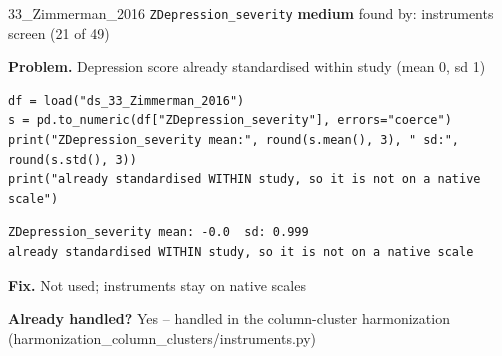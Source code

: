 \documentclass[9pt, t, handout]{beamer}
\newcommand{\ans}[1]{\textcolor{structure.fg}{#1}}
\begin{document}
\begin{frame}[fragile]{33\_Zimmerman\_2016 \quad \texttt{ZDepression\_severity}}
  {\scriptsize\textcolor{blue!55!black}{\textbf{medium}} \quad
   found by: instruments screen \quad (21 of 49)}
  \vspace{3pt}

  {\footnotesize \textbf{Problem.} Depression score already standardised within study (mean 0, sd 1)}
  \vspace{4pt}

  \begin{Verbatim}[fontsize=\tiny, frame=single, framesep=2pt, label=\tiny reproduce]
df = load("ds_33_Zimmerman_2016")
s = pd.to_numeric(df["ZDepression_severity"], errors="coerce")
print("ZDepression_severity mean:", round(s.mean(), 3), " sd:", round(s.std(), 3))
print("already standardised WITHIN study, so it is not on a native scale")
  \end{Verbatim}
  \begin{Verbatim}[fontsize=\tiny, frame=single, framesep=2pt, label=\tiny output]
ZDepression_severity mean: -0.0  sd: 0.999
already standardised WITHIN study, so it is not on a native scale
  \end{Verbatim}
  \vspace{2pt}

  {\footnotesize \textbf{Fix.} Not used; instruments stay on native scales}
  \vspace{2pt}

  {\footnotesize \textbf{Already handled?} \ans{Yes} -- handled in the column-cluster harmonization
   (harmonization\_column\_clusters/instruments.py)}
\end{frame}
\end{document}
